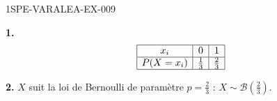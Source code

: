 \begin{corrige}{1SPE-VARALEA-EX-009}

\textbf{1.}
\[
\begin{array}{|c|c|c|}
\hline
x_i & 0 & 1 \\
\hline
P(X=x_i) & \frac{1}{3} & \frac{2}{3} \\
\hline
\end{array}
\]

\medskip
\textbf{2.} $X$ suit la loi de Bernoulli de paramètre $p = \frac{2}{3}$ : $X \sim \mathcal{B}\!\left(\frac{2}{3}\right)$.

\end{corrige}
